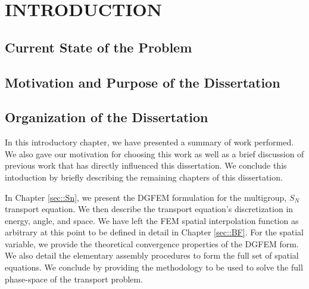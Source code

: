 %
%
%
\pagestyle{plain} %
\setcounter{page}{1}

\chapter{\uppercase {Introduction}}
\label{sec::Intro}


\section{Current State of the Problem}
\label{sec::Intro_Past}


\section{Motivation and Purpose of the Dissertation}
\label{sec::Intro_Purpose}


\section{Organization of the Dissertation}
\label{sec::Intro_Organization}

In this introductory chapter, we have presented a summary of work performed. We also gave our motivation for choosing this work as well as a brief discussion of previous work that has directly influenced this dissertation. We conclude this intoduction by briefly describing the remaining chapters of this dissertation.

In Chapter \ref{sec::Sn}, we present the DGFEM formulation for the multigroup, $S_N$ transport equation. We then describe the transport equation's discretization in energy, angle, and space. We have left the FEM spatial interpolation function as arbitrary at this point to be defined in detail in Chapter \ref{sec::BF}. For the spatial variable, we provide the theoretical convergence properties of the DGFEM form. We also detail the elementary assembly procedures to form the full set of spatial equations. We conclude by providing the methodology to be used to solve the full phase-space of the transport problem.

